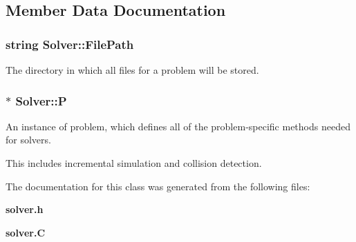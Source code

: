\subsection{Member Data Documentation}
\subsubsection{\setlength{\rightskip}{0pt plus 5cm}string Solver::File\-Path}\label{classSolver_m0}


The directory in which all files for a problem will be stored.

\subsubsection{$\ast$ Solver::P}\label{classSolver_m1}


An instance of problem, which defines all of the problem-specific methods needed for solvers.

This includes incremental simulation and collision detection. 

The documentation for this class was generated from the following files:\begin{CompactItemize}
\item 
{\bf solver.h}\item 
{\bf solver.C}\end{CompactItemize}
